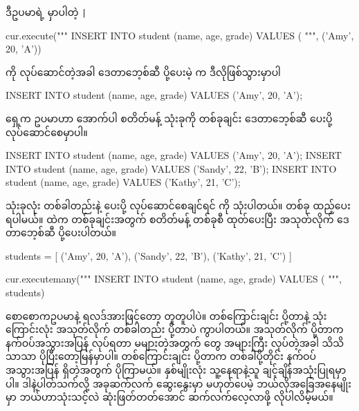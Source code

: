 ဒီဥပမာရဲ့  မှာပါတဲ့ \texttt|%
%
\begin{py}
cur.execute("""
        INSERT INTO student (name, age, grade)
        VALUES (%
    """, ('Amy', 20, 'A'))
\end{py}
%
ကို လုပ်ဆောင်တဲ့အခါ ဒေတာဘေ့စ်ဆီ ပို့ပေးမဲ့  က ဒီလိုဖြစ်သွားမှာပါ
%
\begin{sql}
INSERT INTO student (name, age, grade)
VALUES ('Amy', 20, 'A');
\end{sql}
%
ရှေ့က ဥပမာဟာ အောက်ပါ  စတိတ်မန့် သုံးခုကို တစ်ခုချင်း ဒေတာဘေ့စ်ဆီ ပေးပို့ လုပ်ဆောင်စေမှာပါ။ 

%
\begin{sql}
INSERT INTO student (name, age, grade) VALUES ('Amy', 20, 'A');
INSERT INTO student (name, age, grade) VALUES ('Sandy', 22, 'B');
INSERT INTO student (name, age, grade) VALUES ('Kathy', 21, 'C');
\end{sql}
%

 သုံးခုလုံး တစ်ခါတည်းနဲ့ ပေးပို့ လုပ်ဆောင်စေချင်ရင်  ကို သုံးပါတယ်။  တစ်ခု ထည့်ပေးရပါမယ်။  ထဲက  တစ်ခုချင်းအတွက်  စတိတ်မန့် တစ်ခုစီ ထုတ်ပေးပြီး အသုတ်လိုက် ဒေတာဘေ့စ်ဆီ ပို့ပေးပါတယ်။
%
\begin{py}
students = [
    ('Amy', 20, 'A'),
    ('Sandy', 22, 'B'),
    ('Kathy', 21, 'C')
]

cur.executemany("""
    INSERT INTO student (name, age, grade)
    VALUES (%
""", students)
\end{py}
%
စောစောကဥပမာနဲ့ ရလဒ်အားဖြင့်တော့ တူတူပါပဲ။ တစ်ကြောင်းချင်း ပို့တာနဲ့  သုံးကြောင်းလုံး အသုတ်လိုက် တစ်ခါတည်း ပို့တာပဲ ကွာပါတယ်။ အသုတ်လိုက် ပို့တာက နက်ဝပ်အသွားအပြန်  လုပ်ရတာ မများတဲ့အတွက်  တွေ အများကြီး  လုပ်တဲ့အခါ သိသိသာသာ ပိုပြီးတော့မြန်မှာပါ။ တစ်ကြောင်းချင်း ပို့တာက တစ်ခါပို့တိုင်း နက်ဝပ်အသွားအပြန် ရှိတဲ့အတွက် ပိုကြာမယ်။ နှစ်မျိုးလုံး သူ့နေရာနဲ့သူ ချင့်ချိန်အသုံးပြုရမှာပါ။ ဒါနဲ့ပါတ်သက်လို့ အခုဆက်လက် ဆွေးနွေးမှာ မဟုတ်ပေမဲ့ ဘယ်လိုအခြေအနေမျိုးမှာ ဘယ်ဟာသုံးသင့်လဲ ဆုံးဖြတ်တတ်အောင် ဆက်လက်လေ့လာဖို့ လိုပါလိမ့်မယ်။ 


